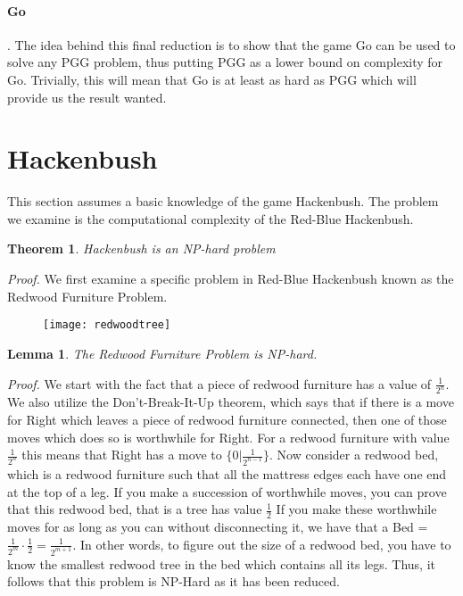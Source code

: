 \documentclass{article}
\newtheorem{theorem}{Theorem}
\newtheorem{lemma}{Lemma}
\begin{document}
\paragraph{Go}.
\newline
\newline
The idea behind this final reduction is to show that the game Go can be used to solve any PGG problem, thus putting PGG as a lower bound on complexity for Go. Trivially, this will mean that Go is at least as hard as PGG which will provide us the result wanted. 

\section{Hackenbush}
This section assumes a basic knowledge of the game Hackenbush. The problem we examine is the computational complexity of the Red-Blue Hackenbush.
\begin{theorem}
Hackenbush is an NP-hard problem
\end{theorem}
\emph{Proof.} We first examine a specific problem in Red-Blue Hackenbush known as the Redwood Furniture Problem. \begin{figure}[htp]
    \centering
    \texttt{[image: redwoodtree]}
\end{figure}
\begin{lemma}
The Redwood Furniture Problem is NP-hard.
\end{lemma}
\emph{Proof.} We start with the fact that a piece of redwood furniture has a value of $\frac{1}{2^n}$. We also utilize the Don't-Break-It-Up theorem, which says that if there is a move for Right which leaves a piece of redwood furniture connected, then one of those moves which does so is worthwhile for Right.
\newline
\newline
For a redwood furniture with value $\frac{1}{2^n}$ this means that Right has a move to $\{0 | \frac{1}{2^{n-1}}\}$. Now consider a redwood bed, which is a redwood furniture such that all the mattress edges each have one end at the top of a leg. 
\newline
\newline
If you make a succession of worthwhile moves, you can prove that this redwood bed, that is a tree has value $\frac{1}{2}$
\newline
\newline
If you make these worthwhile moves for as long as you can without disconnecting it, we have that a Bed = $\frac{1}{2^m}\cdot\frac{1}{2} = \frac{1}{2^{m+1}}$. In other words, to figure out the size of a redwood bed, you have to know the smallest redwood tree in the bed which contains all its legs.
\newline
\newline
Thus, it follows that this problem is NP-Hard as it has been reduced.
\end{document}
